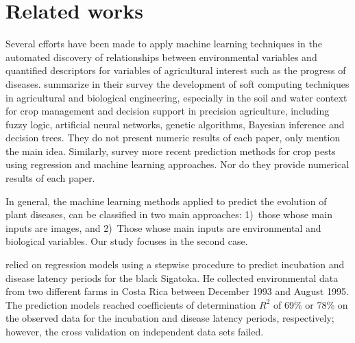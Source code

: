 \section{Related works}
\label{sec:related}

Several efforts have been made to apply machine learning techniques in
the automated discovery of relationships between environmental
variables and quantified descriptors for variables of agricultural 
interest such as the progress of diseases.
% 
\citet{Huang2010} summarize in their survey the
development of soft computing techniques in agricultural and
biological engineering, especially in the soil and water context for crop management and decision support in precision agriculture, including fuzzy logic, artificial neural
networks, genetic algorithms, Bayesian inference and decision trees. They do not present numeric results of each paper, only mention the main idea.
%
Similarly, \citet{Kim2014} survey more recent prediction
methods for crop pests using regression and machine learning approaches. Nor do they provide numerical results of each paper.


In general, the machine learning methods applied to predict the
evolution of plant diseases, can be classified in two main approaches:
1)~those whose main inputs are images, and 2)~Those whose main inputs
are environmental and biological variables. Our study focuses in the
second case.


% 
%
%

\citet{Romero1995} relied on regression models using a stepwise
procedure to predict incubation and disease latency periods for the
black Sigatoka.
% 
He collected environmental data from two different farms in Costa Rica
between December 1993 and August 1995.
%
The prediction models reached coefficients of determination $R^2$ of
69\% or 78\% on the observed data for the incubation and disease
latency periods, respectively; however, the cross validation on
independent data sets failed.

